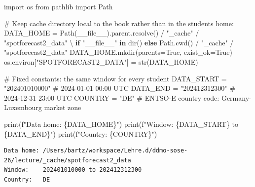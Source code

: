 \documentclass[
  english,
  letterpaper,
]{scrbook}
\newenvironment{Shaded}{\begin{snugshade}}{\end{snugshade}}
\newcommand{\BuiltInTok}[1]{\textcolor[rgb]{0.00,0.23,0.31}{#1}}
\newcommand{\CommentTok}[1]{\textcolor[rgb]{0.37,0.37,0.37}{#1}}
\newcommand{\ControlFlowTok}[1]{\textcolor[rgb]{0.00,0.23,0.31}{\textbf{#1}}}
\newcommand{\ImportTok}[1]{\textcolor[rgb]{0.00,0.46,0.62}{#1}}
\newcommand{\KeywordTok}[1]{\textcolor[rgb]{0.00,0.23,0.31}{\textbf{#1}}}
\newcommand{\NormalTok}[1]{\textcolor[rgb]{0.00,0.23,0.31}{#1}}
\newcommand{\OperatorTok}[1]{\textcolor[rgb]{0.37,0.37,0.37}{#1}}
\newcommand{\SpecialCharTok}[1]{\textcolor[rgb]{0.37,0.37,0.37}{#1}}
\newcommand{\SpecialStringTok}[1]{\textcolor[rgb]{0.13,0.47,0.30}{#1}}
\newcommand{\StringTok}[1]{\textcolor[rgb]{0.13,0.47,0.30}{#1}}
\newcommand{\VariableTok}[1]{\textcolor[rgb]{0.07,0.07,0.07}{#1}}
\begin{document}
\protect{}\label{env-prep}
\begin{Shaded}
\begin{Highlighting}[]
\ImportTok{import}\NormalTok{ os}
\ImportTok{from}\NormalTok{ pathlib }\ImportTok{import}\NormalTok{ Path}

\CommentTok{\# Keep cache directory local to the book rather than in the student\textquotesingle{}s home:}
\NormalTok{DATA\_HOME }\OperatorTok{=}\NormalTok{ Path(}\VariableTok{\_\_file\_\_}\NormalTok{).parent.resolve() }\OperatorTok{/} \StringTok{"\_cache"} \OperatorTok{/} \StringTok{"spotforecast2\_data"} \OperatorTok{\textbackslash{}}
    \ControlFlowTok{if} \StringTok{"\_\_file\_\_"} \KeywordTok{in} \BuiltInTok{dir}\NormalTok{() }\ControlFlowTok{else}\NormalTok{ Path.cwd() }\OperatorTok{/} \StringTok{"\_cache"} \OperatorTok{/} \StringTok{"spotforecast2\_data"}
\NormalTok{DATA\_HOME.mkdir(parents}\OperatorTok{=}\VariableTok{True}\NormalTok{, exist\_ok}\OperatorTok{=}\VariableTok{True}\NormalTok{)}
\NormalTok{os.environ[}\StringTok{"SPOTFORECAST2\_DATA"}\NormalTok{] }\OperatorTok{=} \BuiltInTok{str}\NormalTok{(DATA\_HOME)}

\CommentTok{\# Fixed constants: the same window for every student}
\NormalTok{DATA\_START }\OperatorTok{=} \StringTok{"202401010000"}   \CommentTok{\# 2024{-}01{-}01 00:00 UTC}
\NormalTok{DATA\_END   }\OperatorTok{=} \StringTok{"202412312300"}   \CommentTok{\# 2024{-}12{-}31 23:00 UTC}
\NormalTok{COUNTRY    }\OperatorTok{=} \StringTok{"DE"}             \CommentTok{\# ENTSO{-}E country code: Germany{-}Luxembourg market zone}

\BuiltInTok{print}\NormalTok{(}\SpecialStringTok{f"Data home: }\SpecialCharTok{\{}\NormalTok{DATA\_HOME}\SpecialCharTok{\}}\SpecialStringTok{"}\NormalTok{)}
\BuiltInTok{print}\NormalTok{(}\SpecialStringTok{f"Window:    }\SpecialCharTok{\{}\NormalTok{DATA\_START}\SpecialCharTok{\}}\SpecialStringTok{ to }\SpecialCharTok{\{}\NormalTok{DATA\_END}\SpecialCharTok{\}}\SpecialStringTok{"}\NormalTok{)}
\BuiltInTok{print}\NormalTok{(}\SpecialStringTok{f"Country:   }\SpecialCharTok{\{}\NormalTok{COUNTRY}\SpecialCharTok{\}}\SpecialStringTok{"}\NormalTok{)}
\end{Highlighting}
\end{Shaded}

\begin{verbatim}
Data home: /Users/bartz/workspace/Lehre.d/ddmo-sose-26/lecture/_cache/spotforecast2_data
Window:    202401010000 to 202412312300
Country:   DE
\end{verbatim}
\end{document}
